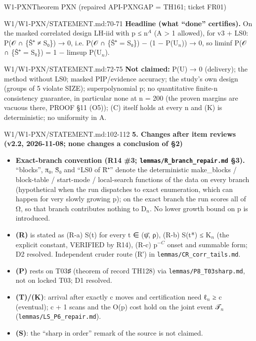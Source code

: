 \begin{card}{W1-PXN}{Theorem PXN (repaired API-PXNGAP = TH161; ticket FR01)}
\begin{stmt}{W1/W1-PXN/STATEMENT.md:70-71}
\textbf{Headline (what ``done'' certifies).} On the masked correlated design LH-iid with p ≤ n$^{A}$ (A > 1 allowed), for v3 + LS0:
P(𝒪 ∩ \{Ŝ⁺ ≠ S₀\}) → 0, i.e. P(𝒪 ∩ \{Ŝ⁺ = S₀\}) − (1 − P(U$_{n}$)) → 0, so liminf P(𝒪 ∩ \{Ŝ⁺ = S₀\}) = 1 − limsup P(U$_{n}$).
\end{stmt}
\begin{stmt}{W1/W1-PXN/STATEMENT.md:72-75}
\textbf{Not claimed:} P(U) → 0 (delivery); the method without LS0; masked PIP/evidence accuracy; the study's own design (groups
of 5 violate SIZE); superpolynomial p; no quantitative finite-n consistency guarantee, in particular none at n = 200 (the
proven margins are vacuous there, PROOF §11 (O5)); (C) itself holds at every n and (K) is deterministic; no uniformity in A.
\end{stmt}
\begin{stmt}{W1/W1-PXN/STATEMENT.md:102-112}
\textbf{5. Changes after item reviews (v2.2, 2026-11-08; none changes a conclusion of §2)}
\begin{itemize}
\item \textbf{Exact-branch convention (R14 \#3; \texttt{lemmas/R\_branch\_repair.md} §3).} ``blocks'', π₀, S̃₀ and ``LS0 of R̄⁺'' denote the
  deterministic make\_blocks / block-table / start-mode / local-search functions of the data on every branch (hypothetical
  when the run dispatches to exact enumeration, which can happen for very slowly growing p); on the exact branch the run
  scores all of Ω, so that branch contributes nothing to D$_{n}$. No lower growth bound on p is introduced.
\item \textbf{(R)} is stated as (R-a) S(t) for every t ∈ (ψ̄, ρ), (R-b) S(t*) ≤ K$_{n}$ (the explicit constant, VERIFIED by R14), (R-c)
  p$^{-C}$ onset and summable form; D2 resolved. Independent cruder route (R′) in \texttt{lemmas/CR\_corr\_tails.md}.
\item \textbf{(P)} rests on T03♯ (theorem of record TH128) via \texttt{lemmas/P8\_T03sharp.md}, not on locked T03; D1 resolved.
\item \textbf{(T)/(K)}: arrival after exactly c moves and certification need ℓ$_{n}$ ≥ c (eventual); c + 1 scans and the O(p) cost hold
  on the joint event 𝒯$_{n}$ (\texttt{lemmas/LS\_P6\_repair.md}).
\item \textbf{(S)}: the ``sharp in order'' remark of the source is not claimed.
\end{itemize}
\end{stmt}


\end{card}

